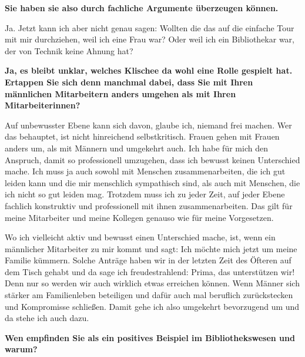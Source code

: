 \documentclass[a4paper,
fontsize=11pt,
oneside,
numbers=noperiodatend,
parskip=half-,
bibliography=totoc,
final
]{scrartcl}
\begin{document}
\textbf{Sie haben sie also durch fachliche Argumente überzeugen können.}

Ja. Jetzt kann ich aber nicht genau sagen: Wollten die das auf die
einfache Tour mit mir durchziehen, weil ich eine Frau war? Oder weil ich
ein Bibliothekar war, der von Technik keine Ahnung hat?

\textbf{Ja, es bleibt unklar, welches Klischee da wohl eine Rolle
gespielt hat. Ertappen Sie sich denn manchmal dabei, dass Sie mit Ihren
männlichen Mitarbeitern anders umgehen als mit Ihren Mitarbeiterinnen?}

Auf unbewusster Ebene kann sich davon, glaube ich, niemand frei machen.
Wer das behauptet, ist nicht hinreichend selbstkritisch. Frauen gehen
mit Frauen anders um, als mit Männern und umgekehrt auch. Ich habe für
mich den Anspruch, damit so professionell umzugehen, dass ich bewusst
keinen Unterschied mache. Ich muss ja auch sowohl mit Menschen
zusammenarbeiten, die ich gut leiden kann und die mir menschlich
sympathisch sind, als auch mit Menschen, die ich nicht so gut leiden
mag. Trotzdem muss ich zu jeder Zeit, auf jeder Ebene fachlich
konstruktiv und professionell mit ihnen zusammenarbeiten. Das gilt für
meine Mitarbeiter und meine Kollegen genauso wie für meine Vorgesetzen.

Wo ich vielleicht aktiv und bewusst einen Unterschied mache, ist, wenn
ein männlicher Mitarbeiter zu mir kommt und sagt: Ich möchte mich jetzt
um meine Familie kümmern. Solche Anträge haben wir in der letzten Zeit
des Öfteren auf dem Tisch gehabt und da sage ich freudestrahlend: Prima,
das unterstützen wir! Denn nur so werden wir auch wirklich etwas
erreichen können. Wenn Männer sich stärker am Familienleben beteiligen
und dafür auch mal beruflich zurückstecken und Kompromisse schließen.
Damit gehe ich also umgekehrt bevorzugend um und da stehe ich auch dazu.

\newpage 

\textbf{Wen empfinden Sie als ein positives Beispiel im Bibliothekswesen
und warum?}
\end{document}
